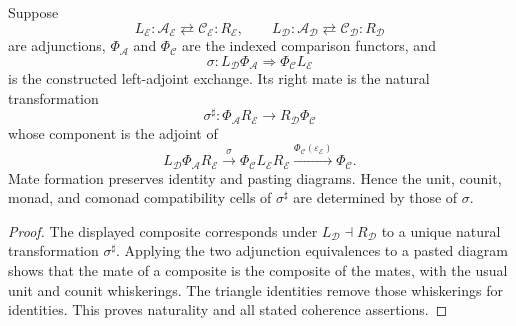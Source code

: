 \begin{lemma}
\label{lem:prequantum-adjunction-mate-comparison}
Suppose
\[
L_{\mathcal E}:\mathcal A_{\mathcal E}
\rightleftarrows\mathcal C_{\mathcal E}:R_{\mathcal E},
\qquad
L_{\mathcal D}:\mathcal A_{\mathcal D}
\rightleftarrows\mathcal C_{\mathcal D}:R_{\mathcal D}
\]
are adjunctions, $\Phi_{\mathcal A}$ and $\Phi_{\mathcal C}$ are the indexed
comparison functors, and
\[
\sigma:L_{\mathcal D}\Phi_{\mathcal A}
\Longrightarrow
\Phi_{\mathcal C}L_{\mathcal E}
\]
is the constructed left-adjoint exchange.  Its right mate is the natural
transformation
\[
\boxed{
\sigma^\sharp:
\Phi_{\mathcal A}R_{\mathcal E}
\longrightarrow
R_{\mathcal D}\Phi_{\mathcal C}
}
\]
whose component is the adjoint of
\[
L_{\mathcal D}\Phi_{\mathcal A}R_{\mathcal E}
\xrightarrow{\sigma}
\Phi_{\mathcal C}L_{\mathcal E}R_{\mathcal E}
\xrightarrow{\Phi_{\mathcal C}(\varepsilon_{\mathcal E})}
\Phi_{\mathcal C}.
\]
Mate formation preserves identity and pasting diagrams.  Hence the unit,
counit, monad, and comonad compatibility cells of $\sigma^\sharp$ are determined
by those of $\sigma$.
\end{lemma}

\begin{proof}
The displayed composite corresponds under
$L_{\mathcal D}\dashv R_{\mathcal D}$ to a unique natural transformation
$\sigma^\sharp$.  Applying the two adjunction equivalences to a pasted diagram
shows that the mate of a composite is the composite of the mates, with the usual
unit and counit whiskerings.  The triangle identities remove those whiskerings
for identities.  This proves naturality and all stated coherence assertions.
\end{proof}

